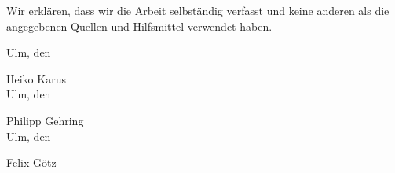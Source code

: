 \documentclass[
a4paper,
10pt,
headsepline,           %
oneside,               %
numbers=noenddot,	   %
bibliography=totoc,    %
]{scrbook}
\newcommand{\Heiko}{Heiko Karus}
\newcommand{\Philipp}{Philipp Gehring}
\newcommand{\Felix}{Felix Götz}
\begin{document}
Wir erklären, dass wir die Arbeit selbständig verfasst und keine anderen als die angegebenen Quellen und Hilfsmittel verwendet haben.\vspace{2cm}

Ulm, den \dotfill

\hspace{10cm} {\footnotesize \Heiko}\\[2em]


Ulm, den \dotfill 

\hspace{10cm} {\footnotesize \Philipp} \\[2em]


Ulm, den \dotfill

\hspace{10cm} {\footnotesize \Felix}
\end{document}
